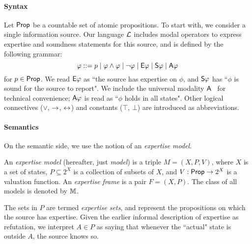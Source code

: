 \paragraph{Syntax}

Let $\Prop$ be a countable set of atomic propositions.
%
To start with, we consider a single information source. Our language $\cL$
includes modal operators to express expertise and soundness statements for this
source, and is defined by the following grammar:
\[
\phi ::=
 p \mid
 \phi \land \phi \mid
 \neg\phi \mid
 \E\phi \mid
 \S\phi \mid
 \A\phi
\]
for $p \in \Prop$. We read $\E\phi$ as ``the source has expertise on
$\phi$, and $\S\phi$ has ``$\phi$ is sound for the source to
report". We include the universal modality $\A$~\citep{goranko_1992}
for technical convenience; $\A\phi$ is read as ``$\phi$ holds in all
states".  Other logical connectives ($\lor$, $\limplies$,
$\liff$) and constants ($\top$, $\bot$) are introduced as
abbreviations.

\paragraph{Semantics}

On the semantic side, we use the notion of an \emph{expertise model}.

\begin{definition}
    \label{def_expertise_model}

    An \emph{expertise model} (hereafter, just \emph{model})
    is a triple $M = (X, P, V)$, where $X$ is a set
    of states, $P \subseteq 2^X$ is a collection of subsets of $X$, and $V:
    \Prop \to 2^X$ is a valuation function. An \emph{expertise frame} is a pair
    $F = (X, P)$.  The class of all models is denoted by $\M$.

\end{definition}

The sets in $P$ are termed \emph{expertise sets}, and represent the
propositions on which the source has expertise. Given the earlier informal
description of expertise as refutation, we interpret $A \in P$ as saying
that whenever the ``actual" state is outside $A$, the source knows so.

